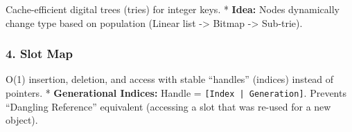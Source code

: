 Cache-efficient digital trees (tries) for integer keys. * \textbf{Idea:}
Nodes dynamically change type based on population (Linear list
-\textgreater{} Bitmap -\textgreater{} Sub-trie).

\hypertarget{slot-map}{%
\subsubsection{4. Slot Map}\label{slot-map}}

O(1) insertion, deletion, and access with stable ``handles'' (indices)
instead of pointers. * \textbf{Generational Indices:} Handle =
\passthrough{\lstinline![Index | Generation]!}. Prevents ``Dangling
Reference'' equivalent (accessing a slot that was re-used for a new
object).

